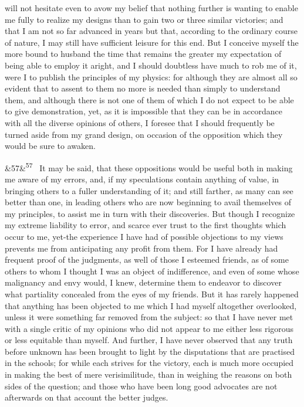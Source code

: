 \documentclass[12pt]{article}
\newcommand{\para}[1][]{\par\noindent\ifx&#1&\else\textsuperscript{\footnotesize #1}~\fi}
\begin{document}
will not hesitate even to avow my belief that nothing further is wanting to enable me fully to realize my designs than to gain two or three similar victories; and that I am not so far advanced in years but that, according to the ordinary course of nature, I may still have sufficient leisure for this end. But I conceive myself the more bound to husband the time that remains the greater my expectation of being able to employ it aright, and I should doubtless have much to rob me of it, were I to publish the principles of my physics: for although they are almost all so evident that to assent to them no more is needed than simply to understand them, and although there is not one of them of which I do not expect to be able to give demonstration, yet, as it is impossible that they can be in accordance with all the diverse opinions of others, I foresee that I should frequently be turned aside from my grand design, on occasion of the opposition which they would be sure to awaken.

\para[57] It may be said, that these oppositions would be useful both in making me aware of my errors, and, if my speculations contain anything of value, in bringing others to a fuller understanding of it; and still farther, as many can see better than one, in leading others who are now beginning to avail themselves of my principles, to assist me in turn with their discoveries. But though I recognize my extreme liability to error, and scarce ever trust to the first thoughts which occur to me, yet-the experience I have had of possible objections to my views prevents me from anticipating any profit from them. For I have already had frequent proof of the judgments, as well of those I esteemed friends, as of some others to whom I thought I was an object of indifference, and even of some whose malignancy and envy would, I knew, determine them to endeavor to discover what partiality concealed from the eyes of my friends. But it has rarely happened that anything has been objected to me which I had myself altogether overlooked, unless it were something far removed from the subject: so that I have never met with a single critic of my opinions who did not appear to me either less rigorous or less equitable than myself. And further, I have never observed that any truth before unknown has been brought to light by the disputations that are practised in the schools; for while each strives for the victory, each is much more occupied in making the best of mere verisimilitude, than in weighing the reasons on both sides of the question; and those who have been long good advocates are not afterwards on that account the better judges.
\end{document}
